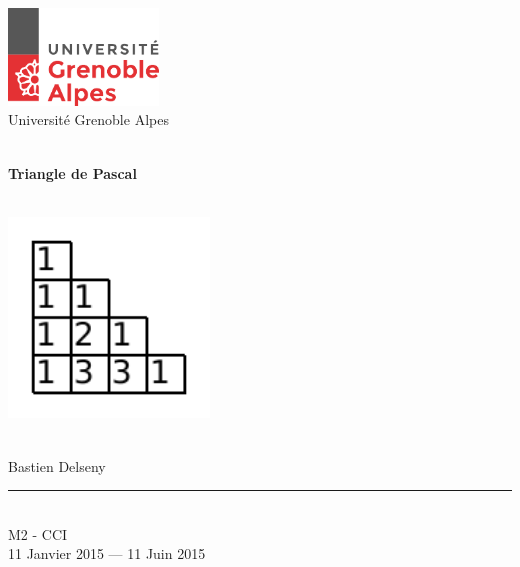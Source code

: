 \begin{titlepage}
  \begin{center}
	
	
      \begin{flushleft} 
       \includegraphics[width=0.3\textwidth]{./images/logo-uga}~\\
       {\small Université Grenoble Alpes}
      \end{flushleft}
    
    
    \vfill

    \HRule \\[0.4cm]
    { \huge \bfseries Triangle de Pascal\\[.4em]}
    \HRule\\[4em]
    
	\begin{centering}
		\includegraphics[width=0.4\textwidth]{./images/triangle}
	\end{centering}\\[4em]
	
	\large{Bastien Delseny}\\
   \vfill
    
    \rule{\linewidth}{0.1mm} \\[0.3cm]
    
    {\footnotesize M2 - CCI}\\[0.3cm]
    
    
    {\large 11 Janvier 2015 — 11 Juin 2015} \PAR

  \end{center}
\end{titlepage}

